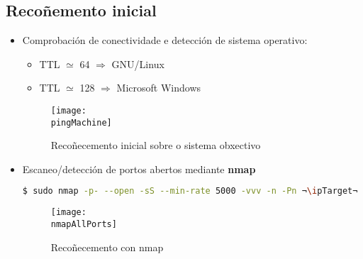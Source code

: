 \documentclass[a4paper]{article}
\newcommand{\pingMachine}{ping_sizzle.png}
\newcommand{\nmapAllPorts}{nmap_sizzle_allPorts.png}
\newcommand{\ipTarget}{10.10.10.103}
\begin{document}
        \subsection{Recoñemento inicial}
        \vspace{0.2cm}
        \begin{itemize}
                \item Comprobación de conectividade e detección de sistema operativo: 
                \begin{itemize}
                        \item TTL $\simeq$ 64 $\Rightarrow$ GNU/Linux
                        \item TTL $\simeq$ 128 $\Rightarrow$ Microsoft Windows
                \end{itemize}

        \begin{figure}[h]
                \begin{center}
                        \begin{tcolorbox}[colback=blackFondoImaxes,hbox]
                                \texttt{[image: \\pingMachine]}
                        \end{tcolorbox}
                \end{center}
                \caption{Recoñecemento inicial sobre o sistema obxectivo}
        \end{figure}

        \vspace{0.2cm}

                \item Escaneo/detección de portos abertos mediante \textbf{nmap}
        \begin{lstlisting}[language=Bash, caption=nmap: Portos TCP open]
$ sudo nmap -p- --open -sS --min-rate 5000 -vvv -n -Pn ¬\ipTarget¬
        \end{lstlisting}
         \begin{figure}[h]
                \begin{center}
                        \begin{tcolorbox}[colback=blackFondoImaxes,hbox]
                                \centering
                                \texttt{[image: \\nmapAllPorts]}
                        \end{tcolorbox}
                \end{center}
                \caption{Recoñecemento con nmap}
        \end{figure}


\end{itemize}
\end{document}

